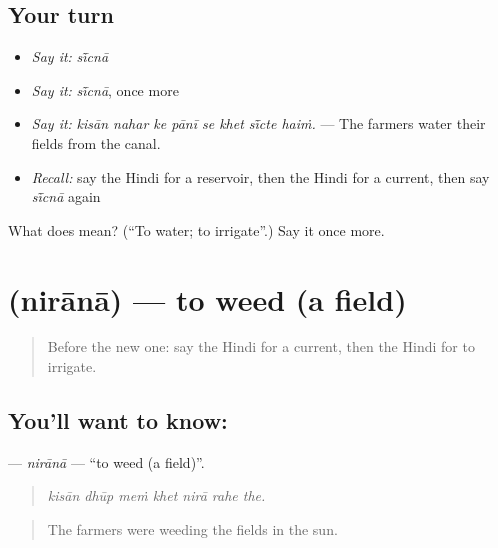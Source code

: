 \subsection*{Your turn}
\begin{itemize}
\raggedright
  \item \emph{Say it:} \emph{sī̃cnā}
  \item \emph{Say it:} \emph{sī̃cnā}, once more
  \item \emph{Say it:} \emph{kisān nahar ke pānī se khet sī̃cte haiṁ.} — The farmers water their fields from the canal.
  \item \emph{Recall:} say the Hindi for a reservoir, then the Hindi for a current, then say \emph{sī̃cnā} again
\end{itemize}

\begin{tcolorbox}[breakable,colback=teal!4,colframe=teal!35!black,title={Before you move on}]
What does  mean? (\textquotedblleft{}To water; to irrigate\textquotedblright{}.) Say it once more.
\end{tcolorbox}
\section[\texorpdfstring{\hi{निराना} (nirānā)}{निराना (nirānā)}]{ (nirānā) — to weed (a field)}

\label{lesson:HI-C443-nirana}



\begin{quote}
Before the new one: say the Hindi for a current, then the Hindi for to irrigate.
\end{quote}

\subsection*{You'll want to know: }
\textbf{} — \emph{nirānā} — \textquotedblleft{}to weed (a field)\textquotedblright{}.

\begin{quote}
      
\end{quote}

\begin{quote}
\emph{kisān dhūp meṁ khet nirā rahe the.}
\end{quote}

\begin{quote}
The farmers were weeding the fields in the sun.
\end{quote}

